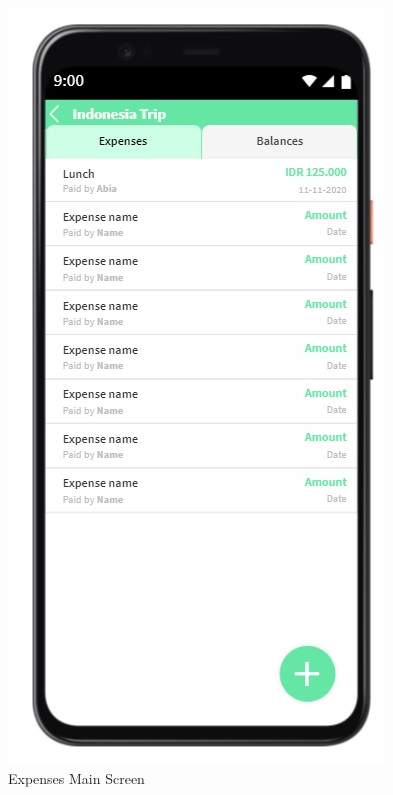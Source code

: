 \documentclass[conference]{IEEEtran}
\begin{document}
\begin{enumerate}
\begin{figure}[H]
                \centerline{\includegraphics[scale=0.5]{img/ui/expenses-main.jpg}}
                \caption{Expenses Main Screen}
                \label{fig:expenses-main-screen}
            \end{figure}
            \begin{figure}[H]

\end{figure}
\end{enumerate}
\end{document}
